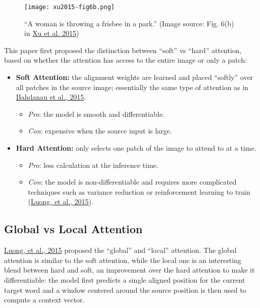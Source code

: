 \documentclass[12pt]{article}
\begin{document}
\begin{figure}[H]
    \centering
    \texttt{[image: xu2015-fig6b.png]}
    \caption{``A woman is throwing a frisbee in a park.'' (Image source: Fig. 6(b) in \href{http://proceedings.mlr.press/v37/xuc15.pdf}{Xu et al. 2015})}
\end{figure}

This paper first proposed the distinction between ``soft'' vs ``hard'' attention, based on whether the attention has access to the entire image or only a patch:
\begin{itemize}
    \item \textbf{Soft Attention:} the alignment weights are learned and placed ``softly'' over all patches in the source image; essentially the same type of attention as in \href{https://arxiv.org/abs/1409.0473}{Bahdanau et al., 2015}.
    \begin{itemize}
        \item \emph{Pro}: the model is smooth and differentiable.
        \item \emph{Con}: expensive when the source input is large.
    \end{itemize}
    \item \textbf{Hard Attention:} only selects one patch of the image to attend to at a time.
    \begin{itemize}
        \item \emph{Pro}: less calculation at the inference time.
        \item \emph{Con}: the model is non-differentiable and requires more complicated techniques such as variance reduction or reinforcement learning to train (\href{https://arxiv.org/abs/1508.04025}{Luong, et al., 2015}).
    \end{itemize}
\end{itemize}

\subsection{Global vs Local Attention}
\href{https://arxiv.org/pdf/1508.04025.pdf}{Luong, et al., 2015} proposed the ``global'' and ``local'' attention. The global attention is similar to the soft attention, while the local one is an interesting blend between hard and soft, an improvement over the hard attention to make it differentiable: the model first predicts a single aligned position for the current target word and a window centered around the source position is then used to compute a context vector.
\end{document}
